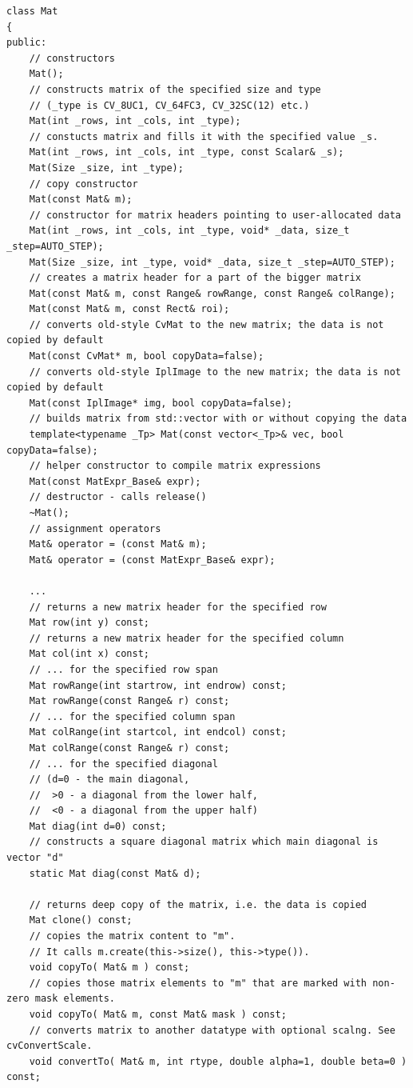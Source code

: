 \begin{lstlisting}
class Mat
{
public:
    // constructors
    Mat();
    // constructs matrix of the specified size and type
    // (_type is CV_8UC1, CV_64FC3, CV_32SC(12) etc.)
    Mat(int _rows, int _cols, int _type);
    // constucts matrix and fills it with the specified value _s.
    Mat(int _rows, int _cols, int _type, const Scalar& _s);
    Mat(Size _size, int _type);
    // copy constructor
    Mat(const Mat& m);
    // constructor for matrix headers pointing to user-allocated data
    Mat(int _rows, int _cols, int _type, void* _data, size_t _step=AUTO_STEP);
    Mat(Size _size, int _type, void* _data, size_t _step=AUTO_STEP);
    // creates a matrix header for a part of the bigger matrix
    Mat(const Mat& m, const Range& rowRange, const Range& colRange);
    Mat(const Mat& m, const Rect& roi);
    // converts old-style CvMat to the new matrix; the data is not copied by default
    Mat(const CvMat* m, bool copyData=false);
    // converts old-style IplImage to the new matrix; the data is not copied by default
    Mat(const IplImage* img, bool copyData=false);
    // builds matrix from std::vector with or without copying the data
    template<typename _Tp> Mat(const vector<_Tp>& vec, bool copyData=false);
    // helper constructor to compile matrix expressions
    Mat(const MatExpr_Base& expr);
    // destructor - calls release()
    ~Mat();
    // assignment operators
    Mat& operator = (const Mat& m);
    Mat& operator = (const MatExpr_Base& expr);

    ...
    // returns a new matrix header for the specified row
    Mat row(int y) const;
    // returns a new matrix header for the specified column
    Mat col(int x) const;
    // ... for the specified row span
    Mat rowRange(int startrow, int endrow) const;
    Mat rowRange(const Range& r) const;
    // ... for the specified column span
    Mat colRange(int startcol, int endcol) const;
    Mat colRange(const Range& r) const;
    // ... for the specified diagonal
    // (d=0 - the main diagonal,
    //  >0 - a diagonal from the lower half,
    //  <0 - a diagonal from the upper half)
    Mat diag(int d=0) const;
    // constructs a square diagonal matrix which main diagonal is vector "d"
    static Mat diag(const Mat& d);

    // returns deep copy of the matrix, i.e. the data is copied
    Mat clone() const;
    // copies the matrix content to "m".
    // It calls m.create(this->size(), this->type()).
    void copyTo( Mat& m ) const;
    // copies those matrix elements to "m" that are marked with non-zero mask elements.
    void copyTo( Mat& m, const Mat& mask ) const;
    // converts matrix to another datatype with optional scalng. See cvConvertScale.
    void convertTo( Mat& m, int rtype, double alpha=1, double beta=0 ) const;


\end{lstlisting}
